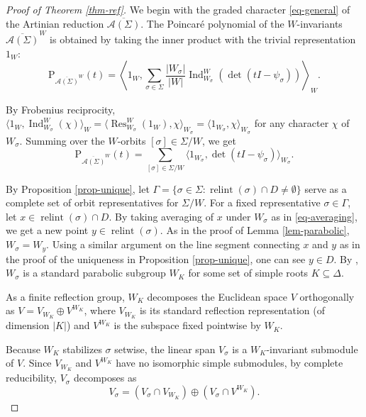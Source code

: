 \documentclass{amsart}
\theoremstyle{definition}
\theoremstyle{remark}
\numberwithin{equation}{section}
\begin{document}
\begin{proof}[Proof of Theorem \ref{thm-ref}] 
We begin with the graded character \eqref{eq-general} of the Artinian reduction $\overline{\mathcal{A}(\Sigma)}$. The Poincaré polynomial of the $W$-invariants $\overline{\mathcal{A}(\Sigma)}^W$ is obtained by taking the inner product with the trivial representation $1_W$:
$$\mathrm{P}_{\overline{\mathcal{A}(\Sigma)}^W}(t) = \left\langle 1_W, \sum_{\sigma \in \Sigma} \frac{\left|W_{\sigma }\right|}{\left|W\right|} \operatorname{Ind}_{W_{\sigma}}^{W}\left(\operatorname{det}(tI-\psi_\sigma)\right) \right\rangle_W.$$

By Frobenius reciprocity, $\langle 1_W, \operatorname{Ind}_{W_\sigma}^W (\chi) \rangle_W = \langle \operatorname{Res}_{W_\sigma}^W (1_W), \chi \rangle_{W_\sigma} = \langle 1_{W_\sigma}, \chi \rangle_{W_\sigma}$ for any character $\chi$ of $W_\sigma$. Summing over the $W$-orbits $[\sigma] \in \Sigma/W$, we get \begin{equation} \label{eq-PP by inner pro}
\mathrm{P}_{\overline{\mathcal{A}(\Sigma)}^W}(t) = \sum_{[\sigma] \in \Sigma/W} \langle 1_{W_\sigma}, \operatorname{det}(tI - \psi_\sigma) \rangle_{W_\sigma}.
\end{equation}

By Proposition \ref{prop-unique}, let $\Gamma = \{ \sigma \in \Sigma : \operatorname{relint}(\sigma) \cap D \neq \emptyset \}$ serve as a complete set of orbit representatives for $\Sigma/W$. For a fixed representative $\sigma \in \Gamma$, let $x \in \operatorname{relint}(\sigma) \cap D$. By taking averaging of $x$ under $W_\sigma$ as in \eqref{eq-averaging}, we get a new point $y\in \operatorname{relint}(\sigma)$. As in the proof of Lemma \ref{lem-parabolic}, $W_\sigma=W_y$. Using a similar argument on the line segment connecting $x$ and $y$ as in the proof of the uniqueness in Proposition \ref{prop-unique}, one can see $y \in D$. By \cite[Section 1.12, Exercise 2]{Humphreys90}, $W_\sigma$ is a standard parabolic subgroup $W_K$ for some set of simple roots $K \subseteq \Delta$.

As a finite reflection group, $W_K$ decomposes the Euclidean space $V$ orthogonally as $V = V_{W_K} \oplus V^{W_K}$, where $V_{W_K}$ is its standard reflection representation (of dimension $|K|$) and $V^{W_K}$ is the subspace fixed pointwise by $W_K$.

Because $W_K$ stabilizes $\sigma$ setwise, the linear span $V_\sigma$ is a $W_K$-invariant submodule of $V$. Since $V_{W_K}$ and $V^{W_K}$ have no isomorphic simple submodules, by complete reducibility, $V_\sigma$ decomposes as
$$V_\sigma = (V_\sigma \cap V_{W_K}) \oplus (V_\sigma \cap V^{W_K}).$$


\end{proof}
\end{document}
